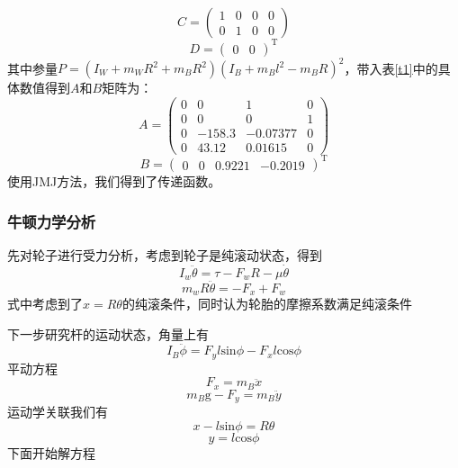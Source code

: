 \documentclass[UTF8,a4paper]{paper}
\begin{document}
\begin{equation}
C = \begin{pmatrix} 1&0&0&0\\0&1&0&0\end{pmatrix}\end{equation}
\begin{equation}D = \begin{pmatrix}0&0\end{pmatrix}^\mathrm{T}\end{equation}
其中参量$P = (I_W+m_WR^2+m_BR^2)(I_B+m_Bl^2-m_BR)^2$，带入表\ref{t1}中的具体数值得到$A$和$B$矩阵为：
\begin{equation}A=\begin{pmatrix}
0&0&1&0\\0&0&0&1\\0&-158.3&-0.07377&0\\0&43.12&0.01615&0\end{pmatrix}\end{equation}
\begin{equation}B=\begin{pmatrix}
0&0&0.9221&-0.2019\end{pmatrix}^\mathrm{T}\end{equation}
使用JMJ方法，我们得到了传递函数。
\subsubsection{牛顿力学分析}
先对轮子进行受力分析，考虑到轮子是纯滚动状态，得到
\begin{equation}
I_w\ddot{\theta}=\tau-F_wR-\mu\dot{\theta}
\label{1}
\end{equation}
\begin{equation}
m_wR\ddot{\theta}=-F_x+F_w
\label{2}
\end{equation}
式中考虑到了$x=R\theta$的纯滚条件，同时认为轮胎的摩擦系数满足纯滚条件

下一步研究杆的运动状态，角量上有
\begin{equation}
I_B\ddot{\phi}=F_yl\mathrm{sin}\phi-F_xl\mathrm{cos}\phi
\label{3}
\end{equation}
平动方程
\begin{equation}
F_x=m_B\ddot{x}
\label{4}
\end{equation}
\begin{equation}
m_B\mathrm{g}-F_y=m_B\ddot{y}
\label{5}
\end{equation}
运动学关联我们有
\begin{equation}
x-l\mathrm{sin}\phi=R\theta
\label{6}
\end{equation}
\begin{equation}
y=l\mathrm{cos}\phi
\label{7}
\end{equation}
下面开始解方程
\end{document}
